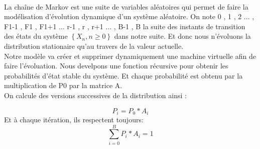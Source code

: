 \quad \\
\noindent La chaîne de Markov est une suite de variables aléatoires qui permet de faire la modélisation d’évolution dynamique d’un système aléatoire. On note {0 , 1 , 2 ... , F1-1 , F1 , F1+1 ... r-1 , r , r+1 ... , B-1 , B} la suite des instants de transition des états du système $\left \{X_{n},n\geq 0 \right \}$  dans notre suite. Et donc nous n’évoluons la distribution stationaire qu’au travers de la valeur actuelle. 
\quad \\
\noindent Notre modèle va créer et supprimer dynamiquement une machine virtuelle afin de faire l’évoluation. Nous develpons une fonction récursive pour obtenir les probabilités d’état stable du système. Et chaque probabilité est obtenu par la multiplication de P0 par la matrice A.
\quad \\
\noindent On calcule des versions successives de la distribution ainsi : 

\begin{equation}
    P_{i}= P_{0} *A_{i}
\end{equation}
\noindent  Et à chaque itération, ils respectent toujours: 
\begin{equation}
    \sum_{i=0}^{B} P_{i} *A_{i} = 1
\end{equation}

